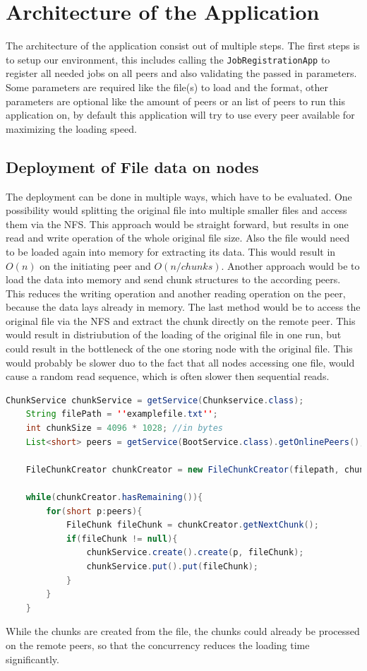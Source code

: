 \section{Architecture of the Application}
The architecture of the application consist out of multiple steps. The first steps is to setup our environment,  this includes calling the \texttt{JobRegistrationApp} to register all needed jobs on all peers and also validating the passed in parameters. Some parameters are required like the file(s) to load and the format, other parameters are optional like the amount of peers or an list of peers to run this application on, by default this application will try to use every peer available for maximizing the loading speed.\\



\subsection{Deployment of File data on nodes}
The deployment can be done in multiple ways, which have to be evaluated. One possibility would splitting the original file into multiple smaller files and access them via the NFS. This approach would be straight forward, but results in one read and write operation of the whole original file size. Also the file would need to be loaded again into memory for extracting its data. This would result in $O(n)$ on the initiating peer and $O(n/chunks)$.
Another approach would be to load the data into memory and send chunk structures to the according peers. This reduces the writing operation and another reading operation on the peer, because the data lays already in memory.
The last method would be to access the original file via the NFS and extract the chunk directly on the remote peer. This would result in distriubution of the loading of the original file in one run, but could result in the bottleneck of the one storing node with the original file. This would probably be slower duo to the fact that all nodes accessing one file, would cause a random read sequence, which is often slower then sequential reads.
\begin{lstlisting}[language=java]
	ChunkService chunkService = getService(Chunkservice.class);
	String filePath = ''examplefile.txt'';
	int chunkSize = 4096 * 1028; //in bytes
	List<short> peers = getService(BootService.class).getOnlinePeers();
	
	FileChunkCreator chunkCreator = new FileChunkCreator(filepath, chunkSize);
	
	while(chunkCreator.hasRemaining()){
		for(short p:peers){
			FileChunk fileChunk = chunkCreator.getNextChunk();
			if(fileChunk != null){
				chunkService.create().create(p, fileChunk);
				chunkService.put().put(fileChunk);
			}
		}
	}
\end{lstlisting}
While the chunks are created from the file, the chunks could already be processed on the remote peers, so that the concurrency reduces the loading time significantly.

